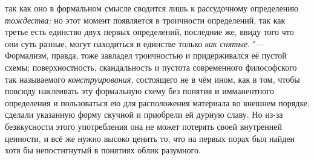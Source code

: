так как оно в формальном смысле сводится лишь к рассудочному
определению {\em тождества;}
но этот момент появляется в троичности определений, так как
третье есть единство двух первых определений, последние же, ввиду того что
они суть разные, могут находиться в единстве только
{\em как снятые}. "---
Формализм, правда, тоже завладел троичностью и
придерживался её пустой схемы; поверхностность, скандальность и пустота
современного философского так называемого {\em конструирования,}
состоящего не в чём ином, как в том, чтобы повсюду наклеивать
эту формальную схему без понятия и имманентного определения и пользоваться
ею для расположения материала во внешнем порядке, сделали указанную форму
скучной и приобрели ей дурную
славу.
Но из-за безвкусности этого употребления она не может
потерять своей внутренней ценности, и всё же нужно высоко ценить то, что на
первых порах был найден хотя бы непостигнутый в понятиях облик разумного.

